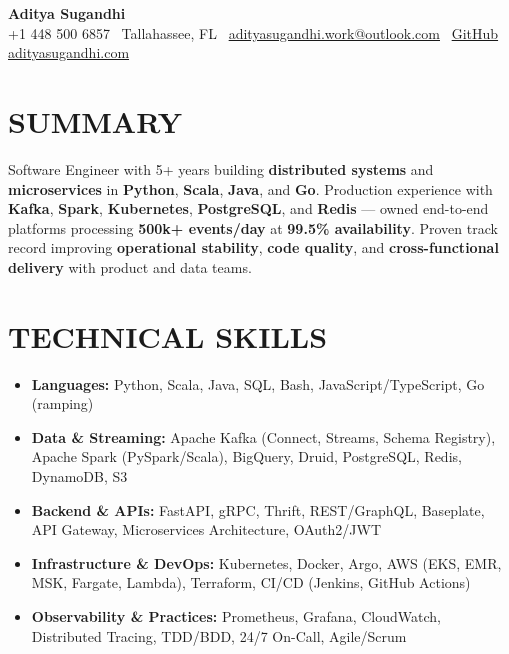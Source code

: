\documentclass[letterpaper,10pt]{article}
\newcommand{\resumeItem}[1]{\item\small #1}
\begin{document}
\begin{center}
{\huge\textbf{Aditya Sugandhi}} \\
+1 448 500 6857 \textbar\ \textcolor{metablue}{Tallahassee, FL} \textbar\
\href{mailto:adityasugandhi.work@outlook.com}{adityasugandhi.work@outlook.com} \textbar\
\href{https://github.com/adityasugandhi}{GitHub}
\textbar \href{https://adityasugandhi.com}{adityasugandhi.com}
\end{center}
\vspace{-12pt}

\section{\textcolor{metablue}{SUMMARY}}
\small
\vspace{-6pt}
Software Engineer with 5+ years building \textbf{distributed systems} and \textbf{microservices} in \textbf{Python}, \textbf{Scala}, \textbf{Java}, and \textbf{Go}. Production experience with \textbf{Kafka}, \textbf{Spark}, \textbf{Kubernetes}, \textbf{PostgreSQL}, and \textbf{Redis} --- owned end-to-end platforms processing \textbf{500k+ events/day} at \textbf{99.5\% availability}. Proven track record improving \textbf{operational stability}, \textbf{code quality}, and \textbf{cross-functional delivery} with product and data teams.

\vspace{-9pt}

\section{\textcolor{metablue}{TECHNICAL SKILLS}}
\vspace{-5pt}
\small
\begin{itemize}
\resumeItem{\textbf{Languages:} Python, Scala, Java, SQL, Bash, JavaScript/TypeScript, Go (ramping)}
\resumeItem{\textbf{Data \& Streaming:} Apache Kafka (Connect, Streams, Schema Registry), Apache Spark (PySpark/Scala), BigQuery, Druid, PostgreSQL, Redis, DynamoDB, S3}
\resumeItem{\textbf{Backend \& APIs:} FastAPI, gRPC, Thrift, REST/GraphQL, Baseplate, API Gateway, Microservices Architecture, OAuth2/JWT}
\resumeItem{\textbf{Infrastructure \& DevOps:} Kubernetes, Docker, Argo, AWS (EKS, EMR, MSK, Fargate, Lambda), Terraform, CI/CD (Jenkins, GitHub Actions)}
\resumeItem{\textbf{Observability \& Practices:} Prometheus, Grafana, CloudWatch, Distributed Tracing, TDD/BDD, 24/7 On-Call, Agile/Scrum}
\end{itemize}
\vspace{-10pt}
\end{document}
